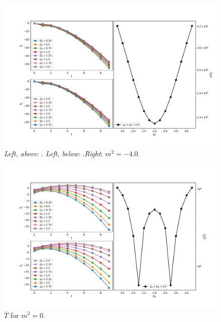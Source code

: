 \documentclass[letterpaper,11pt]{article}
\begin{document}
\begin{figure}
\centering
\includegraphics[width=\textwidth]{./figures/NN_equalfreq_tchannel_n2_m-4_0}
\caption{{\it Left, above}: . {\it Left, below}: .{\it Right}: $m^2 = -4.0$.}
\label{fig:atoi_t_m-4_0}
\end{figure}

\begin{figure}
\centering
	\includegraphics[width=\textwidth]{./figures/NN_equalfreq_tchannel_n2_m0_0}
	\caption{$\overline{T}$ for $m^2 = 0$.}
\end{figure}
\end{document}
